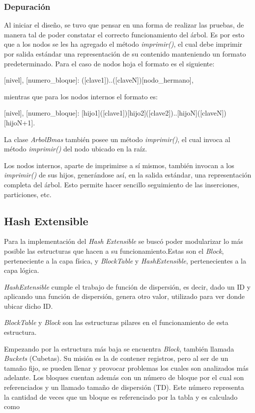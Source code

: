 \documentclass{article}
\begin{document}
\subsubsection{Depuración}

	Al iniciar el diseño, se tuvo que pensar en una forma de realizar las pruebas, de manera tal de poder constatar el correcto funcionamiento del árbol. Es por esto que a los nodos se les ha agregado el método \textit{imprimir()}, el cual debe imprimir por salida estándar una representación de su contenido manteniendo un formato predeterminado. Para el caso de nodos hoja el formato es el siguiente:
	\bigskip

	{\ttfamily\footnotesize
	[nivel], [numero\_bloque]: ([clave1])..([claveN])[nodo\_hermano], \\}

	mientras que para los nodos internos el formato es:
	\bigskip

	{\ttfamily\footnotesize
	[nivel], [numero\_bloque]: [hijo1]([clave1])[hijo2]([clave2])..[hijoN]([claveN])[hijoN+1]. \\}

	La clase \textit{ArbolBmas} también posee un método \textit{imprimir()}, el cual invoca al método \textit{imprimir()} del nodo ubicado en la raíz.
	\par
	Los nodos internos, aparte de imprimirse a sí mismos, también invocan a los \textit{imprimir()} de sus hijos, generándose así, en la salida estándar, una representación completa del árbol. Esto permite hacer sencillo seguimiento de las inserciones, particiones, etc.
\bigskip\medskip



\subsection{Hash Extensible}
\medskip

	Para la implementación del \textit{Hash Extensible} se buscó poder modularizar lo más posible las estructuras que hacen a su funcionamiento.Estas son el \textit{Block}, perteneciente a la capa física, y \textit{BlockTable} y \textit{HashExtensible}, pertenecientes a la capa lógica.
	\par
	\textit{HashExtensible} cumple el trabajo de función de dispersión, es decir, dado un ID y aplicando una función de dispersión, genera otro valor, utilizado para ver donde ubicar dicho ID.
	\par
	\textit{BlockTable} y \textit{Block} son las estructuras pilares en el funcionamiento de esta estructura.
	\par
	Empezando por la estructura más baja se encuentra \textit{Block}, también llamada \textit{Buckets} (Cubetas). Su misión es la de contener registros, pero al ser de un tamaño fijo, se pueden llenar y provocar problemas los cuales son analizados más adelante. Los bloques cuentan además con un número de bloque por el cual son referenciados y un llamado tamaño de dispersión (TD). Este número representa la cantidad de veces que un bloque es referenciado por la tabla y es calculado como
	\medskip
\end{document}
